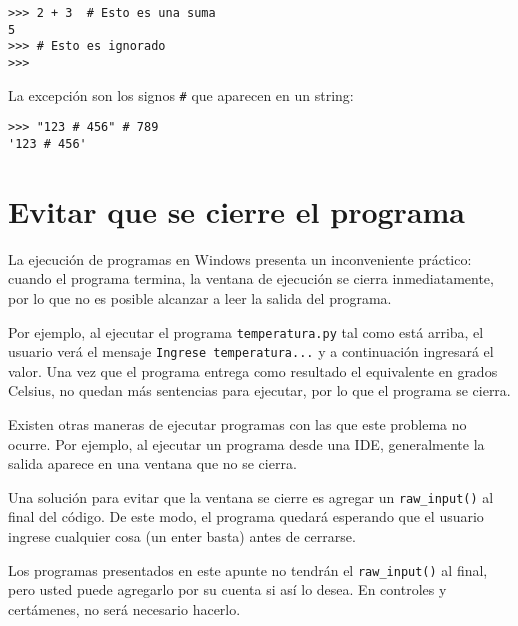 \begin{lstlisting}
>>> 2 + 3  # Esto es una suma
5
>>> # Esto es ignorado
>>>
\end{lstlisting}

La excepción son los signos \lstinline!#! que aparecen en un string:

\begin{lstlisting}
>>> "123 # 456" # 789
'123 # 456'
\end{lstlisting}

\section{Evitar que se cierre el programa}

La ejecución de programas en Windows presenta un inconveniente práctico:
cuando el programa termina, la ventana de ejecución se cierra
inmediatamente, por lo que no es posible alcanzar a leer la salida del
programa.

Por ejemplo, al ejecutar el programa \lstinline!temperatura.py! tal como
está arriba, el usuario verá el mensaje
\lstinline!Ingrese temperatura...! y a continuación ingresará el valor.
Una vez que el programa entrega como resultado el equivalente en grados
Celsius, no quedan más sentencias para ejecutar, por lo que el programa
se cierra.

Existen otras maneras de ejecutar programas con las que este problema no
ocurre. Por ejemplo, al ejecutar un programa desde una IDE,
generalmente la salida aparece en una ventana que no se cierra.

Una solución para evitar que la ventana se cierre es agregar un
\lstinline!raw_input()! al final del código. De este modo, el programa
quedará esperando que el usuario ingrese cualquier cosa (un enter basta)
antes de cerrarse.

Los programas presentados en este apunte no tendrán el
\lstinline!raw_input()! al final, pero usted puede agregarlo por su
cuenta si así lo desea. En controles y certámenes, no será necesario
hacerlo.
